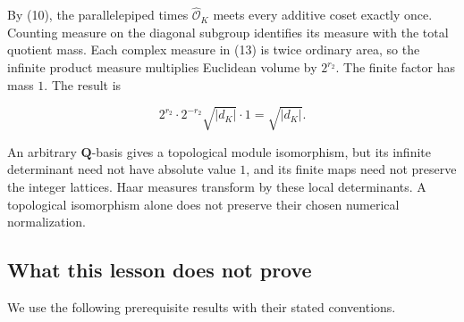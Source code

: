 \documentclass[
  english,
  11pt,
  a4paper,
]{article}
\begin{document}
By (10), the parallelepiped times \(\widehat{\mathcal O}_K\) meets every
additive coset exactly once. Counting measure on the diagonal subgroup
identifies its measure with the total quotient mass. Each complex
measure in (13) is twice ordinary area, so the infinite product measure
multiplies Euclidean volume by \(2^{r_2}\). The finite factor has mass
\(1\). The result is

\[2^{r_2}\cdot2^{-r_2}\sqrt{|d_K|}\cdot1=\sqrt{|d_K|}.\]

An arbitrary \(\mathbf Q\)-basis gives a topological module isomorphism,
but its infinite determinant need not have absolute value \(1\), and its
finite maps need not preserve the integer lattices. Haar measures
transform by these local determinants. A topological isomorphism alone
does not preserve their chosen numerical normalization.

\subsection{What this lesson does not
prove}\label{NT-ADL-02--what-this-lesson-does-not-prove}

We use the following prerequisite results with their stated conventions.
\end{document}
